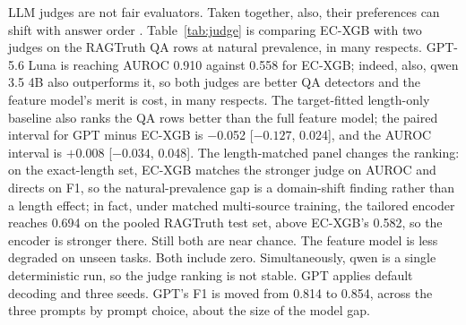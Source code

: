 \documentclass[a4paper,fleqn]{cas-sc}
\begin{document}
LLM judges are not fair evaluators. Taken together, also, their preferences can shift with answer order \cite{wang2024fair}. Table~\ref{tab:judge} is comparing EC-XGB with two judges on the RAGTruth QA rows at natural prevalence, in many respects. GPT-5.6 Luna is reaching AUROC 0.910 against 0.558 for EC-XGB; indeed, also, qwen 3.5 4B also outperforms it, so both judges are better QA detectors and the feature model's merit is cost, in many respects. The target-fitted length-only baseline also ranks the QA rows better than the full feature model; the paired interval for GPT minus EC-XGB is $-$0.052 [$-0.127$, 0.024], and the AUROC interval is $+$0.008 [$-0.034$, 0.048]. The length-matched panel changes the ranking: on the exact-length set, EC-XGB matches the stronger judge on AUROC and directs on F1, so the natural-prevalence gap is a domain-shift finding rather than a length effect; in fact, under matched multi-source training, the tailored encoder reaches 0.694 on the pooled RAGTruth test set, above EC-XGB's 0.582, so the encoder is stronger there. Still both are near chance. The feature model is less degraded on unseen tasks. Both include zero. Simultaneously, qwen is a single deterministic run, so the judge ranking is not stable. GPT applies default decoding and three seeds. GPT's F1 is moved from 0.814 to 0.854, across the three prompts by prompt choice, about the size of the model gap.
\end{document}
